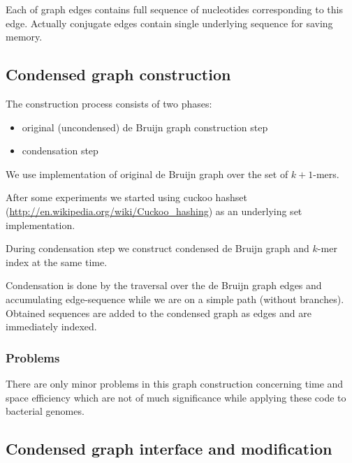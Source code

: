 \documentclass[12pt]{article}
\newcommand{\dbg}{de Bruijn graph}
\begin{document}
Each of graph edges contains full sequence of nucleotides corresponding to this edge. Actually conjugate edges contain single underlying sequence for saving memory.

\subsection{Condensed graph construction}
The construction process consists of two phases:
\begin{itemize}
\item original (uncondensed) \dbg{} construction step
\item condensation step
\end{itemize}

We use implementation of original \dbg{} over the set of $k+1$-mers. 

After some experiments we started using cuckoo hashset (\url{http://en.wikipedia.org/wiki/Cuckoo_hashing}) as an underlying set implementation.

During condensation step we construct condensed \dbg{} and $k$-mer index at the same time.

Condensation is done by the traversal over the \dbg{} edges and accumulating edge-sequence while we are on a simple path (without branches). Obtained sequences are added to the condensed graph as edges and are immediately indexed.


\subsubsection{Problems}
There are only minor problems in this graph construction concerning time and space efficiency which are not of much significance while applying these code to bacterial genomes. %


\subsection{Condensed graph interface and modification}
\end{document}

